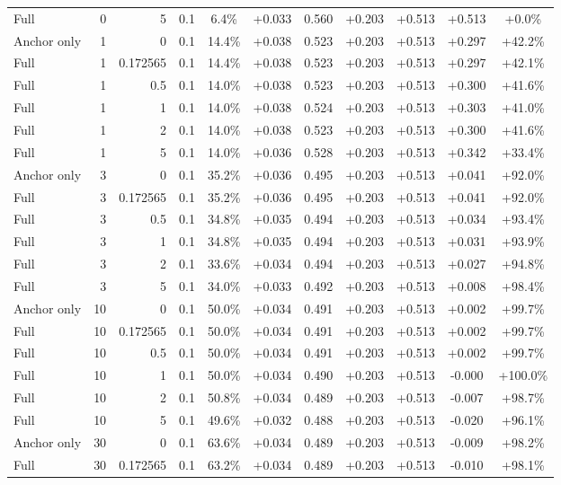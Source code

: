 \begin{table}[htbp]
\begin{tabular}{lrrrccccccc}
Full & 0 & 5 & 0.1 & 6.4\% & +0.033 & 0.560 & +0.203 & +0.513 & +0.513 & +0.0\% \\
Anchor only & 1 & 0 & 0.1 & 14.4\% & +0.038 & 0.523 & +0.203 & +0.513 & +0.297 & +42.2\% \\
Full & 1 & 0.172565 & 0.1 & 14.4\% & +0.038 & 0.523 & +0.203 & +0.513 & +0.297 & +42.1\% \\
Full & 1 & 0.5 & 0.1 & 14.0\% & +0.038 & 0.523 & +0.203 & +0.513 & +0.300 & +41.6\% \\
Full & 1 & 1 & 0.1 & 14.0\% & +0.038 & 0.524 & +0.203 & +0.513 & +0.303 & +41.0\% \\
Full & 1 & 2 & 0.1 & 14.0\% & +0.038 & 0.523 & +0.203 & +0.513 & +0.300 & +41.6\% \\
Full & 1 & 5 & 0.1 & 14.0\% & +0.036 & 0.528 & +0.203 & +0.513 & +0.342 & +33.4\% \\
Anchor only & 3 & 0 & 0.1 & 35.2\% & +0.036 & 0.495 & +0.203 & +0.513 & +0.041 & +92.0\% \\
Full & 3 & 0.172565 & 0.1 & 35.2\% & +0.036 & 0.495 & +0.203 & +0.513 & +0.041 & +92.0\% \\
Full & 3 & 0.5 & 0.1 & 34.8\% & +0.035 & 0.494 & +0.203 & +0.513 & +0.034 & +93.4\% \\
Full & 3 & 1 & 0.1 & 34.8\% & +0.035 & 0.494 & +0.203 & +0.513 & +0.031 & +93.9\% \\
Full & 3 & 2 & 0.1 & 33.6\% & +0.034 & 0.494 & +0.203 & +0.513 & +0.027 & +94.8\% \\
Full & 3 & 5 & 0.1 & 34.0\% & +0.033 & 0.492 & +0.203 & +0.513 & +0.008 & +98.4\% \\
Anchor only & 10 & 0 & 0.1 & 50.0\% & +0.034 & 0.491 & +0.203 & +0.513 & +0.002 & +99.7\% \\
Full & 10 & 0.172565 & 0.1 & 50.0\% & +0.034 & 0.491 & +0.203 & +0.513 & +0.002 & +99.7\% \\
Full & 10 & 0.5 & 0.1 & 50.0\% & +0.034 & 0.491 & +0.203 & +0.513 & +0.002 & +99.7\% \\
Full & 10 & 1 & 0.1 & 50.0\% & +0.034 & 0.490 & +0.203 & +0.513 & -0.000 & +100.0\% \\
Full & 10 & 2 & 0.1 & 50.8\% & +0.034 & 0.489 & +0.203 & +0.513 & -0.007 & +98.7\% \\
Full & 10 & 5 & 0.1 & 49.6\% & +0.032 & 0.488 & +0.203 & +0.513 & -0.020 & +96.1\% \\
Anchor only & 30 & 0 & 0.1 & 63.6\% & +0.034 & 0.489 & +0.203 & +0.513 & -0.009 & +98.2\% \\
Full & 30 & 0.172565 & 0.1 & 63.2\% & +0.034 & 0.489 & +0.203 & +0.513 & -0.010 & +98.1\% \\

\end{tabular}
\end{table}
